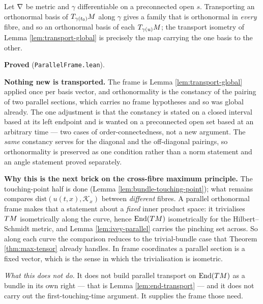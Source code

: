 \begin{lemma}
  \label{lem:parallel-frame}
  \leanok
  Let $\nabla$ be metric and $\gamma$ differentiable on a preconnected open $s$. Transporting an
  orthonormal basis of $T_{\gamma(t_0)}M$ along $\gamma$ gives a family that is orthonormal in
  \emph{every} fibre, and so an orthonormal basis of each $T_{\gamma(u)}M$; the transport
  isometry of Lemma \ref{lem:transport-global} is precisely the map carrying the one basis to
  the other.

  \textbf{Proved} (\texttt{ParallelFrame.lean}).

  \textbf{Nothing new is transported.} The frame is Lemma \ref{lem:transport-global} applied
  once per basis vector, and orthonormality is the constancy of the pairing of two parallel
  sections, which carries no frame hypotheses and so was global already. The one adjustment is
  that the constancy is stated on a closed interval based at its left endpoint and is wanted on
  a preconnected open set based at an arbitrary time --- two cases of order-connectedness, not
  a new argument. The \emph{same} constancy serves for the diagonal and the off-diagonal
  pairings, so orthonormality is preserved as one condition rather than a norm statement and an
  angle statement proved separately.

  \textbf{Why this is the next brick on the cross-fibre maximum principle.} The touching-point
  half is done (Lemma \ref{lem:bundle-touching-point}); what remains compares
  $\mathrm{dist}(u(t,x),\mathcal{K}_x)$ between \emph{different} fibres. A parallel orthonormal
  frame makes that a statement about a \emph{fixed} inner product space: it trivialises $TM$
  isometrically along the curve, hence $\operatorname{End}(TM)$ isometrically for the
  Hilbert--Schmidt metric, and Lemma \ref{lem:ivey-parallel} carries the pinching set across.
  So along each curve the comparison reduces to the trivial-bundle case that Theorem
  \ref{thm:max-tensor} already handles. In frame coordinates a parallel section is a fixed
  vector, which is the sense in which the trivialisation is isometric.

  \emph{What this does not do.} It does not build parallel transport on
  $\operatorname{End}(TM)$ as a bundle in its own right --- that is Lemma
  \ref{lem:end-transport} --- and it does not carry out the first-touching-time argument. It
  supplies the frame those need.
\end{lemma}

